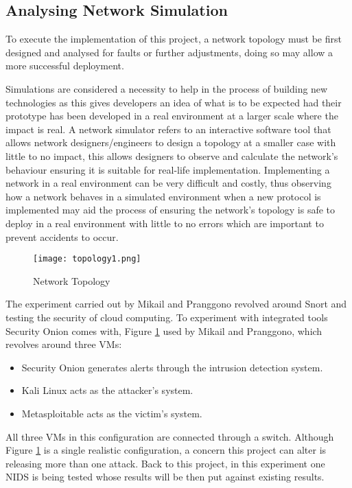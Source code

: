 \documentclass[12pt]{article}
\begin{document}
		
		
		
		
		\subsection{ Analysing Network Simulation}		
		
		
		To execute the implementation of this project, a network topology must be first designed and analysed for faults or further adjustments, doing so may allow a more successful deployment. 
		
		Simulations are considered a necessity to help in the process of building new technologies as this gives developers an idea of what is to be expected had their prototype has been developed in a real environment at a larger scale where the impact is real. A network simulator refers to an interactive software tool that allows network designers/engineers to design a topology at a smaller case with little to no impact, this allows designers to observe and calculate the network's behaviour ensuring it is suitable for real-life implementation. Implementing a network in a real environment can be very difficult and costly, thus observing how a network behaves in a simulated environment when a new protocol is implemented may aid the process of ensuring the network's topology is safe to deploy in a real environment with little to no errors which are important to prevent accidents to occur.
		
		
		
		\begin{center}
			\begin{figure}[H]
				\centering
				\texttt{[image: topology1.png]}
				\caption{Network Topology  \cite{mikail_2019_securing}}
				\label{fig:topology1}
			\end{figure}
		\end{center}
		The experiment carried out by Mikail and Pranggono revolved around Snort and testing the security of cloud computing.
		To experiment with integrated tools  Security Onion comes with, Figure \ref{fig:topology1} used by Mikail and Pranggono, which revolves around three VMs:
		\begin{itemize}
			\item Security Onion generates alerts through the intrusion detection system.
			\item Kali Linux acts as the attacker's system.
			\item Metasploitable acts as the victim's system.
		\end{itemize}
		All three VMs in this configuration are connected through a switch. 
		Although Figure \ref{fig:topology1} is a single realistic configuration, a concern this project can alter is releasing more than one attack. Back to this project, in this experiment one NIDS is being tested whose results will be then put against existing results.
		
\end{document}
